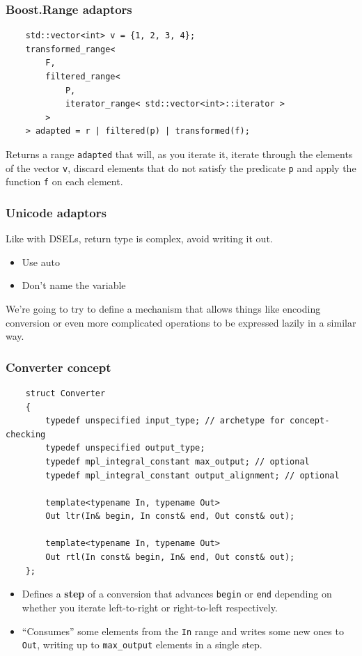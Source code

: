 \documentclass{beamer}
\begin{document}
\begin{frame}[fragile]
	\frametitle{Boost.Range adaptors}
	
	\begin{lstlisting}
	std::vector<int> v = {1, 2, 3, 4};
	transformed_range<
	    F,
	    filtered_range<
	        P,
	        iterator_range< std::vector<int>::iterator >
	    >
	> adapted = r | filtered(p) | transformed(f);
	\end{lstlisting}
	\bigskip
	
	Returns a range \lstinline{adapted} that will, as you iterate it, iterate through the elements of the vector \lstinline{v}, discard elements that do not satisfy the predicate \lstinline{p} and apply the function \lstinline{f} on each element.
	
\end{frame}

\begin{frame}
	\frametitle{Unicode adaptors}
	
	Like with DSELs, return type is complex, avoid writing it out.
	\begin{itemize}
		\item Use auto
		\item Don't name the variable
	\end{itemize}
	\bigskip
	
	We're going to try to define a mechanism that allows things like encoding conversion or even more complicated operations to be expressed lazily in a similar way.
	
\end{frame}

\begin{frame}[fragile]
	\frametitle{Converter concept}
	
	\begin{lstlisting}
	struct Converter
	{
	    typedef unspecified input_type; // archetype for concept-checking
	    typedef unspecified output_type;
	    typedef mpl_integral_constant max_output; // optional
	    typedef mpl_integral_constant output_alignment; // optional
	
	    template<typename In, typename Out>
	    Out ltr(In& begin, In const& end, Out const& out);
	
	    template<typename In, typename Out>
	    Out rtl(In const& begin, In& end, Out const& out);		
	};
	\end{lstlisting}
	
	\small{
	\begin{itemize}
	\item Defines a \textbf{step} of a conversion that advances \lstinline{begin} or \lstinline{end}
	depending on whether you iterate left-to-right or right-to-left respectively.
	
	\item ``Consumes'' some elements from the \lstinline{In} range and writes some new ones to \lstinline{Out},
	writing up to \lstinline{max_output} elements in a single step.
	\end{itemize} }
	
\end{frame}
\end{document}
